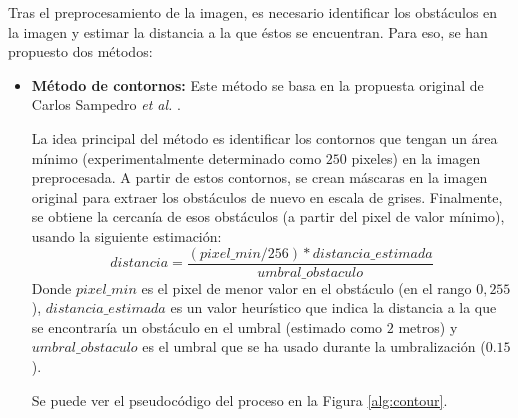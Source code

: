 Tras el preprocesamiento de la imagen, es necesario identificar los obstáculos en la imagen   y estimar la distancia a la que éstos se encuentran. Para eso, se han propuesto dos métodos:

\begin{itemize}
	\item \textbf{Método de contornos:} Este método se basa en la propuesta original de Carlos Sampedro \textit{et al.} \cite{Sampedro2018}. 
	
	La idea principal del método es identificar los contornos que tengan un área mínimo (experimentalmente determinado como $250$ pixeles) en la imagen preprocesada. A partir de estos contornos, se crean máscaras en la imagen original para extraer los obstáculos de nuevo en escala de grises. Finalmente, se obtiene la cercanía de esos obstáculos (a partir del pixel de valor mínimo), usando la siguiente estimación:
	\[distancia = \frac{(pixel\_min / 256) * distancia\_estimada}{umbral\_obstaculo}\]
Donde $pixel\_min$ es el pixel de menor valor en el obstáculo (en el rango ${0, 255}$), $distancia\_estimada$ es un valor heurístico que indica la distancia a la que se encontraría un obstáculo en el umbral (estimado como $2$ metros) y $umbral\_obstaculo$ es el umbral que se ha usado durante la umbralización ($0.15$).

Se puede ver el pseudocódigo del proceso en la Figura \ref{alg:contour}.


\end{itemize}
